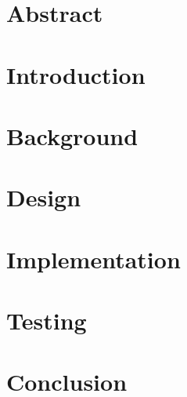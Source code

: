 \documentclass{article}
\begin{document}
\title{}
\author{Tom Hutchings}

\maketitle

\section{Abstract}

\section{Introduction}

\section{Background}

\section{Design}

\section{Implementation}

\section{Testing}

\section{Conclusion}
\end{document}
